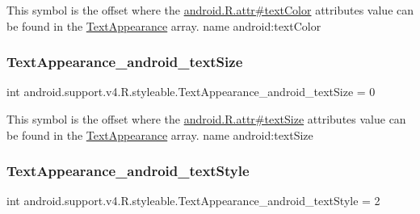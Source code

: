 This symbol is the offset where the \hyperlink{}{android.\+R.\+attr\#text\+Color} attribute\textquotesingle{}s value can be found in the \hyperlink{classandroid_1_1support_1_1v4_1_1R_1_1styleable_a81c402d7a6e327c354a1cf72b21fc4f5}{Text\+Appearance} array.  name android\+:text\+Color \mbox{\label{classandroid_1_1support_1_1v4_1_1R_1_1styleable_a040fc8f325c7f3437cb0de7391a9f66b}} 
\subsubsection{\texorpdfstring{Text\+Appearance\+\_\+android\+\_\+text\+Size}{TextAppearance\_android\_textSize}}
{\footnotesize\ttfamily int android.\+support.\+v4.\+R.\+styleable.\+Text\+Appearance\+\_\+android\+\_\+text\+Size = 0\hspace{0.3cm}{\ttfamily [static]}}

This symbol is the offset where the \hyperlink{}{android.\+R.\+attr\#text\+Size} attribute\textquotesingle{}s value can be found in the \hyperlink{classandroid_1_1support_1_1v4_1_1R_1_1styleable_a81c402d7a6e327c354a1cf72b21fc4f5}{Text\+Appearance} array.  name android\+:text\+Size \mbox{\label{classandroid_1_1support_1_1v4_1_1R_1_1styleable_ad2a5ecd007f593b55beb33c50e15db62}} 
\subsubsection{\texorpdfstring{Text\+Appearance\+\_\+android\+\_\+text\+Style}{TextAppearance\_android\_textStyle}}
{\footnotesize\ttfamily int android.\+support.\+v4.\+R.\+styleable.\+Text\+Appearance\+\_\+android\+\_\+text\+Style = 2\hspace{0.3cm}{\ttfamily [static]}}

